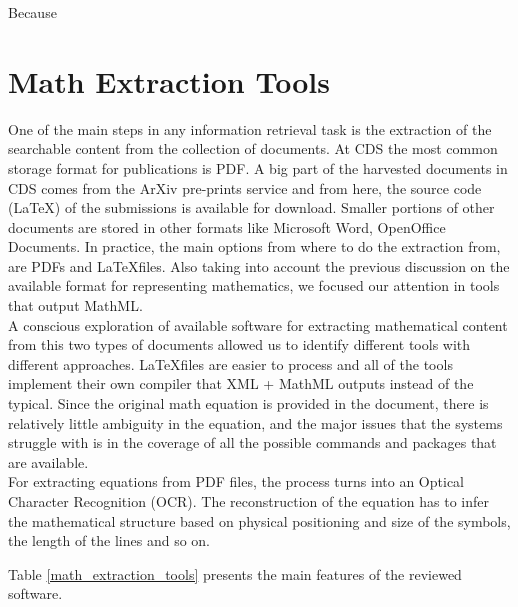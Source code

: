 Because

\section{Math Extraction Tools}
One of the main steps in any information retrieval task is the extraction of the searchable content from the collection of documents. At CDS the most common storage format for publications is PDF. A big part of the harvested documents in CDS comes from the ArXiv pre-prints service and from here, the source code (\LaTeX) of the submissions is available for download. Smaller portions of other documents are stored in other formats like Microsoft Word, OpenOffice Documents.
In practice, the main options from where to do the extraction from, are PDFs and \LaTeX  files. Also taking into account the previous discussion on the available format for representing mathematics, we focused our attention in tools that output MathML.  \\
A conscious exploration of available software for extracting mathematical content from this two types of documents allowed us to identify different tools with different approaches. 
\LaTeX  files are easier to process and all of the tools implement their own compiler that XML + MathML outputs instead of the typical. Since the original math equation is provided in the document, there is relatively little ambiguity in the equation, and the major issues that the systems struggle with is in the coverage of all the possible commands and packages that are available. \\
For extracting equations from PDF files, the process turns into an Optical Character Recognition (OCR). The reconstruction of the equation has to infer the mathematical structure based on physical positioning and size of the symbols, the length of the lines and so on.

Table \ref{math_extraction_tools} presents the main features of the reviewed software. 

